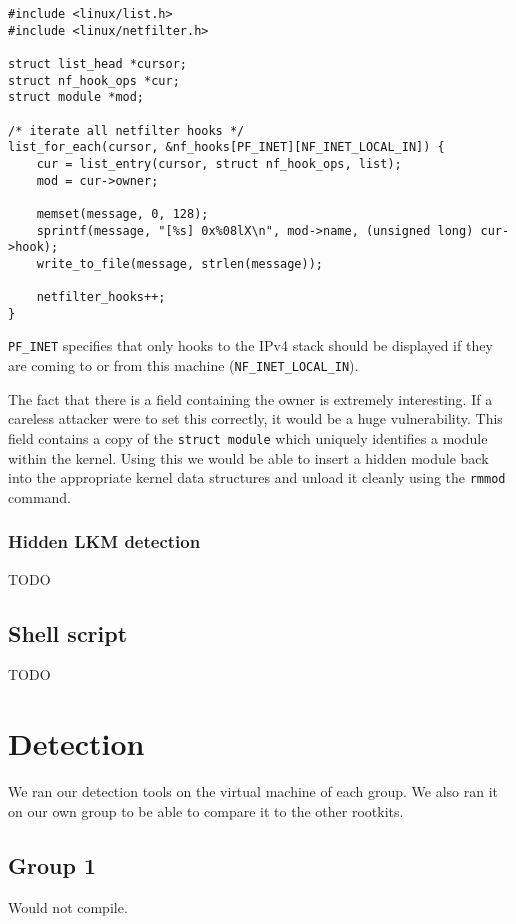 \documentclass[10pt, letterpaper]{scrartcl}
\begin{document}
\begin{lstlisting}
#include <linux/list.h>
#include <linux/netfilter.h>

struct list_head *cursor;
struct nf_hook_ops *cur;
struct module *mod;

/* iterate all netfilter hooks */
list_for_each(cursor, &nf_hooks[PF_INET][NF_INET_LOCAL_IN]) {
	cur = list_entry(cursor, struct nf_hook_ops, list);
	mod = cur->owner;
	
	memset(message, 0, 128);
	sprintf(message, "[%s] 0x%08lX\n", mod->name, (unsigned long) cur->hook);
	write_to_file(message, strlen(message));
	
	netfilter_hooks++;
}
\end{lstlisting}

\texttt{PF\_INET} specifies that only hooks to the IPv4 stack should be displayed if they are coming to or from this machine (\texttt{NF\_INET\_LOCAL\_IN}).

The fact that there is a field containing the owner is extremely interesting.
If a careless attacker were to set this correctly, it would be a huge vulnerability.
This field contains a copy of the \texttt{struct module} which uniquely identifies a module within the kernel.
Using this we would be able to insert a hidden module back into the appropriate kernel data structures and unload it cleanly using the \texttt{rmmod} command.

\subsubsection{Hidden LKM detection}
TODO

\subsection{Shell script}\label{sec:script}
TODO

\section{Detection}\label{sec:detection}
We ran our detection tools on the virtual machine of each group.
We also ran it on our own group to be able to compare it to the other rootkits.
\subsection{Group 1}
Would not compile.
\end{document}
